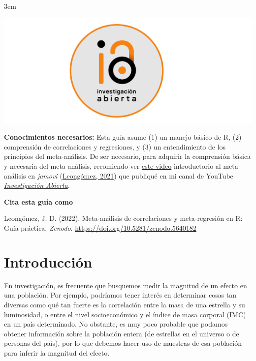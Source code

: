 \documentclass[
  bookmarksnumbered]{article}
\begin{document}
\par
\endgroup

\par
\begingroup
\leftskip3em
\rightskip\leftskip
\footnotesize

\href{https://www.youtube.com/@InvestigacionAbierta}{\includegraphics{images/Logo-IA-Rectangulo.pdf}}

\textbf{Conocimientos necesarios:} Esta guía asume (1) un manejo básico de R, (2) comprensión de correlaciones y regresiones, y (3) un entendimiento de los principios del meta-análisis. De ser necesario, para adquirir la comprensión básica y necesaria del meta-análisis, recomiendo ver \href{https://youtu.be/ntBbkOn9D_o}{este video} introductorio al meta-análisis en \emph{jamovi} (\protect\hyperlink{ref-leongomezMetaanalysis2021}{Leongómez, 2021}) que publiqué en mi canal de YouTube \href{https://www.youtube.com/@InvestigacionAbierta}{\emph{Investigación Abierta}}.

\par
\endgroup
\vfill

\textbf{Cita esta guía como } \hrulefill 

\begin{hangparas}{.25in}{1}
Leongómez, J. D. (2022). Meta-análisis de correlaciones y meta-regresión en R: Guía práctica. \textit{Zenodo}. \url{https://doi.org/10.5281/zenodo.5640182}
\end{hangparas}
\newpage

{\hypersetup{hidelinks}
 \setcounter{tocdepth}{5}
 \tableofcontents
}

\hypertarget{introducciuxf3n}{%
\section{Introducción}\label{introducciuxf3n}}

En investigación, es frecuente que busquemos medir la magnitud de un efecto en una población. Por ejemplo, podríamos tener interés en determinar cosas tan diversas como qué tan fuerte es la correlación entre la masa de una estrella y su luminosidad, o entre el nivel socioeconómico y el índice de masa corporal (IMC) en un país determinado. No obstante, es muy poco probable que podamos obtener información sobre la población entera (de estrellas en el universo o de personas del país), por lo que debemos hacer uso de muestras de esa población para inferir la magnitud del efecto.
\end{document}
